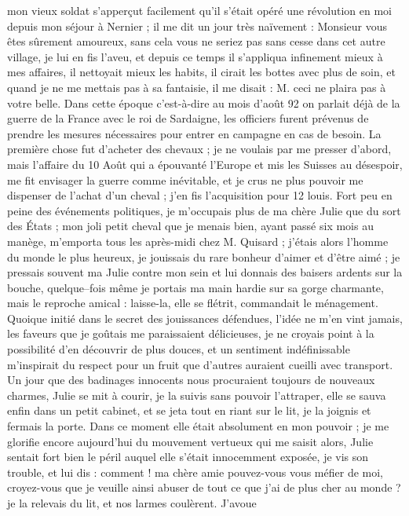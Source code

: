 \documentclass[12pt]{article}
\begin{document}
 mon vieux soldat s’apperçut facilement qu’il s’était
opéré une révolution en moi depuis mon séjour à Nernier ; il me dit un jour très naïvement :
Monsieur vous êtes sûrement amoureux, sans cela vous ne seriez pas sans cesse dans cet autre
village, je lui en fis l’aveu, et depuis ce temps il s’appliqua infinement mieux à mes affaires, il
nettoyait mieux les habits, il cirait les bottes avec plus de soin, et quand je ne me mettais pas à
sa fantaisie, il me disait : M. ceci ne plaira pas à votre belle. Dans cette époque c’est-à-dire au
mois d’août 92 on parlait déjà de la guerre de la France avec le roi de Sardaigne, les officiers
furent prévenus de prendre les mesures nécessaires pour entrer en campagne en cas de besoin. La
première chose fut d’acheter des chevaux ; je ne voulais par me presser d’abord, mais l’affaire du
10 Août qui a épouvanté l’Europe et mis les Suisses au désespoir, me fit envisager la guerre comme
inévitable, et je crus ne plus pouvoir me dispenser de l’achat d’un cheval ; j’en fis l’acquisition
pour 12 louis. Fort peu en peine des événements politiques, je m’occupais plus de ma chère Julie que
du sort des États ; mon joli petit cheval que je menais bien, ayant passé six mois au manège,
m’emporta tous les après-midi chez M. Quisard ; j’étais alors l’homme du monde le plus heureux, je
jouissais du rare bonheur d’aimer et d’être aimé ; je pressais souvent ma Julie contre mon sein et
lui donnais des baisers ardents sur la bouche, quelque–fois même je portais ma main hardie sur sa
gorge charmante, mais le reproche amical : laisse-la, elle se flétrit, commandait le ménagement.
Quoique initié dans le secret des jouissances défendues, l’idée ne m’en vint jamais, les faveurs que
je goûtais me paraissaient délicieuses, je ne croyais point à la possibilité d’en découvrir de plus
douces, et un sentiment indéfinissable m’inspirait du respect pour un fruit que d’autres auraient
cueilli avec transport. Un jour que des badinages innocents nous procuraient toujours de nouveaux
charmes, Julie se mit à courir, je la suivis sans pouvoir l’attraper, elle se sauva enfin dans un
petit cabinet, et se jeta tout en riant sur le lit, je la joignis et fermais la porte. Dans ce
moment elle était absolument en mon pouvoir ; je me glorifie encore aujourd’hui du mouvement
vertueux qui me saisit alors, Julie sentait fort bien le péril auquel elle s’était innocemment
exposée, je vis son trouble, et lui dis : comment ! ma chère amie pouvez-vous vous méfier de moi,
croyez-vous que je veuille ainsi abuser de tout ce que j’ai de plus cher au monde ? je la relevais
du lit, et nos larmes coulèrent. J’avoue
\end{document}
